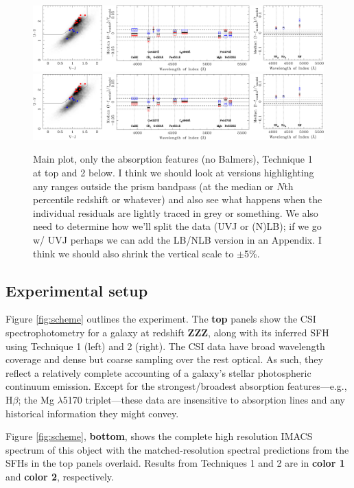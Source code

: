 \documentclass[a4paper,fleqn,usenatbib]{mnras}
\newcommand{\resp}{respectively}
\newcommand{\bfr}{\bf\color{red}}
\newcommand{\bfb}{\color{myblue}}
\begin{document}
\begin{figure}
\includegraphics[width = \textwidth]{residuals}
\includegraphics[width = \textwidth]{residuals}
\caption{\bfb Main plot, only the absorption features (no Balmers), Technique 1 at top and 2 below.
		I think we should look at versions highlighting any ranges outside the prism bandpass 
		(at the median or $N$th percentile redshift or whatever) and also see what happens when
		the individual residuals are lightly traced in grey or something. We also need to determine
		how we'll split the data (UVJ or (N)LB); if we go w/ UVJ perhaps we can add the LB/NLB
		version in an Appendix. I think we should also shrink the vertical scale to $\pm$5\%.}
\label{fig:resids}
\end{figure}

\subsection{Experimental setup}
\label{sec:setup}

Figure \ref{fig:scheme} outlines the experiment. The {\bfr top} panels show the
CSI spectrophotometry for a galaxy at redshift {\bfr ZZZ}, along with its inferred SFH using Technique 
1 (left) and 2 (right). The CSI data have broad wavelength 
coverage and dense but coarse sampling over the rest optical. As such, they reflect a relatively
complete accounting of a galaxy's stellar photospheric continuum emission. Except for the
strongest/broadest absorption features---e.g., H$\beta$; the Mg $\lambda$5170 triplet---these data are 
insensitive to absorption lines and any historical information they might convey.

Figure \ref{fig:scheme}, {\bfr bottom}, shows the complete high resolution IMACS spectrum of 
this object with the matched-resolution spectral predictions from the SFHs in the top panels overlaid. 
Results from Techniques 1 and 2 are in {\bfr color 1} and {\bfr color 2}, \resp. 
\end{document}
